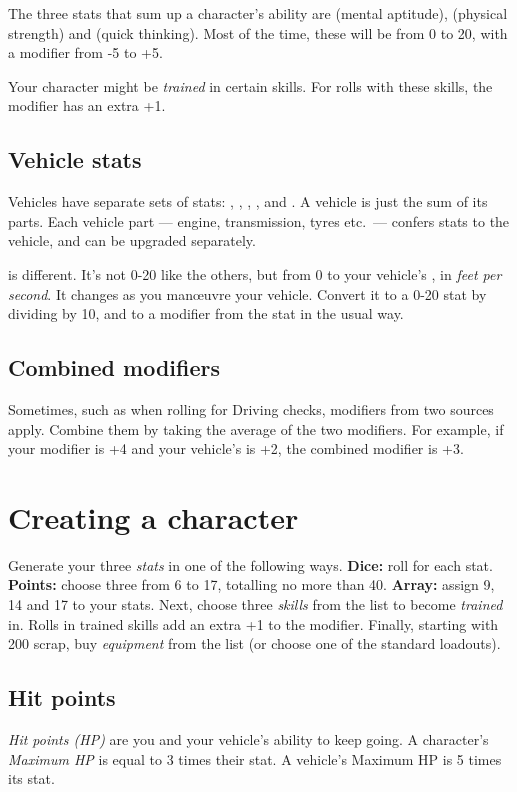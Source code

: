 \documentclass[10pt, a4paper, twocolumn]{article}
\begin{document}
The three stats that sum up a character's ability are  (mental
aptitude),  (physical strength) and  (quick thinking).
Most of the time, these will be from 0 to 20, with a modifier from -5 to +5.

Your character might be \emph{trained} in certain skills. For rolls with these
skills, the modifier has an extra +1.

\subsection{Vehicle stats}
Vehicles have separate sets of stats: , ,
, ,  and . A vehicle
is just the sum of its parts. Each vehicle part --- engine, transmission, tyres
etc.\ --- confers stats to the vehicle, and can be upgraded separately.

 is different. It's not 0-20 like the others, but from 0 to your
vehicle's , in \emph{feet per second}. It changes as you
man\oe{}uvre your vehicle. Convert it to a 0-20 stat by dividing by 10, and to a
modifier from the stat in the usual way.

\subsection{Combined modifiers}
Sometimes, such as when rolling for Driving checks, modifiers from two sources
apply. Combine them by taking the average of the two modifiers. For example, if
your  modifier is +4 and your vehicle's  is +2, the
combined modifier is +3.

\section{Creating a character}
Generate your three \emph{stats} in one of the following ways. \textbf{Dice:}
roll  for each stat. \textbf{Points:} choose three from 6 to 17,
totalling no more than 40. \textbf{Array:} assign 9, 14 and 17 to your stats.
Next, choose three \emph{skills} from the list to become \emph{trained} in.
Rolls in trained skills add an extra +1 to the modifier. Finally, starting with
200 scrap, buy \emph{equipment} from the list (or choose one of the standard
loadouts).

\subsection{Hit points}
\emph{Hit points (HP)} are you and your vehicle's ability to keep going. A
character's \emph{Maximum HP} is equal to 3 times their  stat. A
vehicle's Maximum HP is 5 times its  stat.
\end{document}
